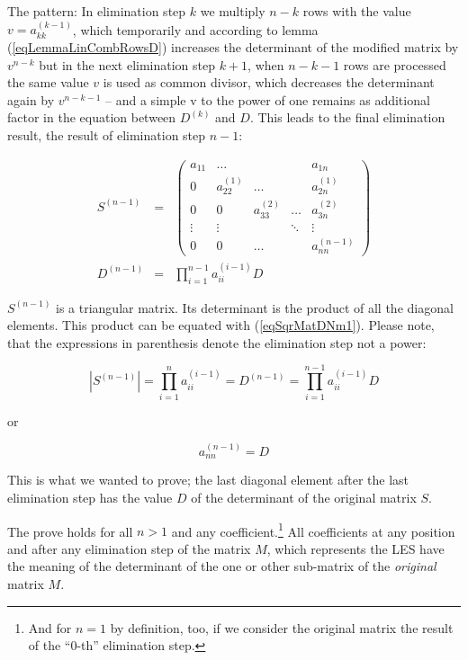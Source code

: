 \noindent
The pattern: In elimination step $k$ we multiply $n-k$ rows with the
value $v = a^{(k-1)}_{kk}$, which temporarily and according to lemma
(\ref{eqLemmaLinCombRowsD}) increases the determinant of the modified
matrix by $v^{n-k}$ but in the next elimination step $k+1$, when $n-k-1$
rows are processed the same value $v$ is used as common divisor, which
decreases the determinant again by $v^{n-k-1}$ -- and a simple v to the
power of one remains as additional factor in the equation between
$D^{(k)}$ and $D$. This leads to the final elimination result, the result
of elimination step $n-1$:

\begin{eqnarray}
S^{(n-1)} & = &
\left(
\begin{array}{ccccc}
a_{11} & \ldots       &              &        & a_{1n}       \\
0      & a^{(1)}_{22} & \ldots       &        & a^{(1)}_{2n} \\
0      & 0            & a^{(2)}_{33} & \ldots & a^{(2)}_{3n} \\
\vdots & \vdots       &              & \ddots & \vdots       \\
0      & 0            & \hdots       &        & a^{(n-1)}_{nn}
\end{array}
\right) \nonumber \\
D^{(n-1)} & = & \prod^{n-1}_{i=1} a^{(i-1)}_{ii} D \label{eqSqrMatDNm1}
\end{eqnarray}

\noindent
$S^{(n-1)}$ is a triangular matrix. Its determinant is the product of all
the diagonal elements. This product can be equated with
(\ref{eqSqrMatDNm1}). Please note, that the expressions in parenthesis
denote the elimination step not a power:

\begin{equation*}
\left| S^{(n-1)} \right| = \prod^{n}_{i=1} a^{(i-1)}_{ii}
                         = D^{(n-1)}
                         = \prod^{n-1}_{i=1} a^{(i-1)}_{ii} D
\end{equation*}

\noindent or

\begin{equation}
a^{(n-1)}_{nn} = D
\end{equation}

\noindent
This is what we wanted to prove; the last diagonal element after the last
elimination step has the value $D$ of the determinant of the original
matrix $S$.

The prove holds for all $n>1$ and any coefficient.\footnote{And for $n=1$
by definition, too, if we consider the original matrix the result of the
``0-th'' elimination step.} All coefficients at any position and after any
elimination step of the matrix $M$, which represents the LES have the
meaning of the determinant of the one or other sub-matrix of the
\emph{original} matrix $M$.

